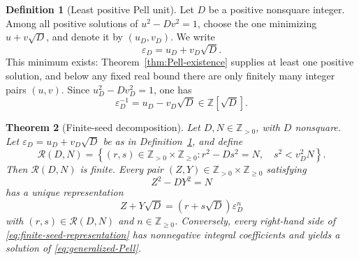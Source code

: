 \documentclass[11pt,a4paper]{amsart}
\newtheorem{theorem}{Theorem}[section]
\theoremstyle{definition}
\newtheorem{definition}[theorem]{Definition}
\newcommand{\Z}{\mathbb Z}
\newcommand{\eps}{\varepsilon}
\numberwithin{equation}{section}
\begin{document}
\begin{definition}[Least positive Pell unit]
\label{def:fundamental}
Let \(D\) be a positive nonsquare integer.  Among all positive solutions of
\(u^2-Dv^2=1\), choose the one minimizing \(u+v\sqrt D\), and denote it by
\((u_D,v_D)\).  We write
\begin{equation}
 \eps_D=u_D+v_D\sqrt D.
 \label{eq:epsilon-D}
\end{equation}
This minimum exists: Theorem~\ref{thm:Pell-existence} supplies at least one positive
solution, and below any fixed real bound there are only finitely many integer pairs
\((u,v)\).  Since
\(u_D^2-Dv_D^2=1\), one has
\begin{equation}
 \eps_D^{-1}=u_D-v_D\sqrt D\in\Z[\sqrt D].
 \label{eq:epsilon-inverse}
\end{equation}
\end{definition}

\begin{theorem}[Finite-seed decomposition]
\label{thm:finite-seed}
Let \(D,N\in\Z_{>0}\), with \(D\) nonsquare.  Let
\(\eps_D=u_D+v_D\sqrt D\) be as in Definition~\ref{def:fundamental}, and define
\begin{equation}
 \mathcal R(D,N)=
 \left\{
 (r,s)\in\Z_{>0}\times\Z_{\geq0}:
 r^2-Ds^2=N,\quad s^2<v_D^2N
 \right\}.
 \label{eq:RDN}
\end{equation}
Then \(\mathcal R(D,N)\) is finite.  Every pair
\((Z,Y)\in\Z_{>0}\times\Z_{\geq0}\) satisfying
\begin{equation}
 Z^2-DY^2=N
 \label{eq:generalized-Pell}
\end{equation}
has a unique representation
\begin{equation}
 Z+Y\sqrt D=(r+s\sqrt D)\eps_D^n
 \label{eq:finite-seed-representation}
\end{equation}
with \((r,s)\in\mathcal R(D,N)\) and \(n\in\Z_{\geq0}\).  Conversely, every
right-hand side of \eqref{eq:finite-seed-representation} has nonnegative integral
coefficients and yields a solution of \eqref{eq:generalized-Pell}.
\end{theorem}
\end{document}
